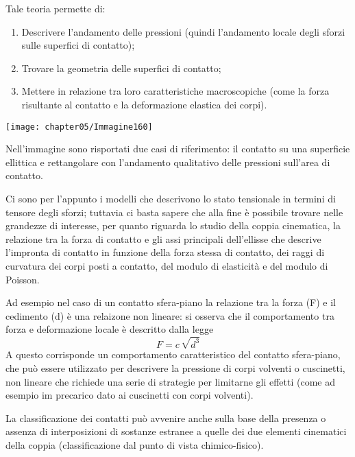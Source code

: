 Tale teoria permette di:
\begin{enumerate}
\item Descrivere l'andamento delle pressioni (quindi l'andamento locale degli sforzi sulle superfici di contatto);
\item Trovare la geometria delle superfici di contatto;
\item Mettere in relazione tra loro caratteristiche macroscopiche (come la forza risultante al contatto e la deformazione elastica dei corpi).
\end{enumerate}

\begin{center}
\texttt{[image: chapter05/Immagine160]}
\end{center}

Nell'immagine sono risportati due casi di riferimento: il contatto su una superficie ellittica e rettangolare con l'andamento qualitativo delle pressioni sull'area di contatto.

Ci sono per l'appunto i modelli che descrivono lo stato tensionale in termini di tensore degli sforzi; tuttavia ci basta sapere che alla fine è possibile trovare nelle grandezze di interesse, per quanto riguarda lo studio della coppia cinematica, la relazione tra la forza di contatto e gli assi principali dell'ellisse che descrive l'impronta di contatto in funzione della forza stessa di contatto, dei raggi di curvatura dei corpi posti a contatto, del modulo di elasticità e del modulo di Poisson.

Ad esempio nel caso di un contatto sfera-piano la relazione tra la forza (F) e il cedimento (d) è una relaizone non lineare: si osserva che il comportamento tra forza e deformazione locale è descritto dalla legge 
\[F = c\,\sqrt{d^3}\]
A questo corrisponde un comportamento caratteristico del contatto sfera-piano, che può essere utilizzato per descrivere la pressione di corpi volventi o cuscinetti, non lineare che richiede una serie di strategie per limitarne gli effetti (come ad esempio im precarico dato ai cuscinetti con corpi volventi).\newline

La classificazione dei contatti può avvenire anche sulla base della presenza o assenza di interposizioni di sostanze estranee a quelle dei due elementi cinematici della coppia (classificazione dal punto di vista chimico-fisico).

